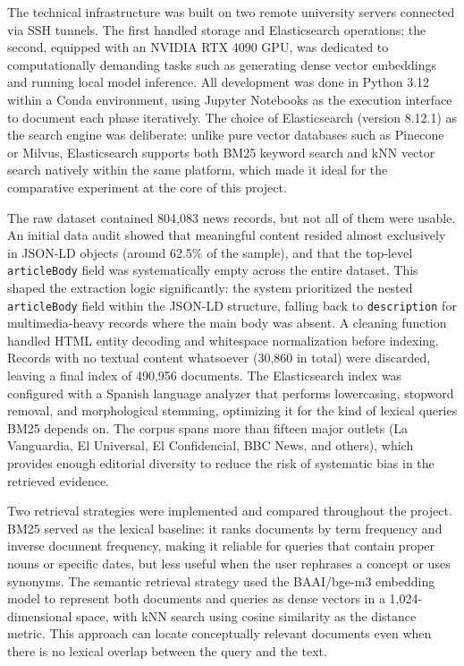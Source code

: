 The technical infrastructure was built on two remote university servers connected via SSH tunnels. The first handled storage and Elasticsearch operations; the second, equipped with an NVIDIA RTX 4090 GPU, was dedicated to computationally demanding tasks such as generating dense vector embeddings and running local model inference. All development was done in Python 3.12 within a Conda environment, using Jupyter Notebooks as the execution interface to document each phase iteratively. The choice of Elasticsearch (version 8.12.1) as the search engine was deliberate: unlike pure vector databases such as Pinecone or Milvus, Elasticsearch supports both BM25 keyword search and kNN vector search natively within the same platform, which made it ideal for the comparative experiment at the core of this project.

The raw dataset contained 804,083 news records, but not all of them were usable. An initial data audit showed that meaningful content resided almost exclusively in JSON-LD objects (around 62.5\% of the sample), and that the top-level \texttt{articleBody} field was systematically empty across the entire dataset. This shaped the extraction logic significantly: the system prioritized the nested \texttt{articleBody} field within the JSON-LD structure, falling back to \texttt{description} for multimedia-heavy records where the main body was absent. A cleaning function handled HTML entity decoding and whitespace normalization before indexing. Records with no textual content whatsoever (30,860 in total) were discarded, leaving a final index of 490,956 documents. The Elasticsearch index was configured with a Spanish language analyzer that performs lowercasing, stopword removal, and morphological stemming, optimizing it for the kind of lexical queries BM25 depends on. The corpus spans more than fifteen major outlets (La Vanguardia, El Universal, El Confidencial, BBC News, and others), which provides enough editorial diversity to reduce the risk of systematic bias in the retrieved evidence.

Two retrieval strategies were implemented and compared throughout the project. BM25 served as the lexical baseline: it ranks documents by term frequency and inverse document frequency, making it reliable for queries that contain proper nouns or specific dates, but less useful when the user rephrases a concept or uses synonyms. The semantic retrieval strategy used the BAAI/bge-m3 embedding model to represent both documents and queries as dense vectors in a 1,024-dimensional space, with kNN search using cosine similarity as the distance metric. This approach can locate conceptually relevant documents even when there is no lexical overlap between the query and the text.

